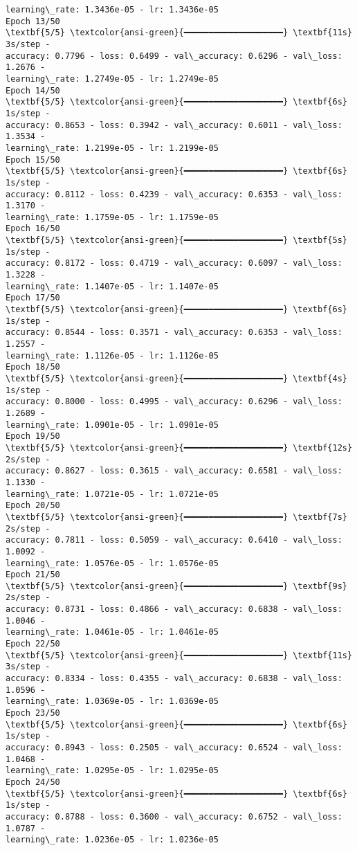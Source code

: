 \documentclass[11pt]{article}
\begin{document}
\begin{Verbatim}[commandchars=\\\{\}]
learning\_rate: 1.3436e-05 - lr: 1.3436e-05
Epoch 13/50
\textbf{5/5} \textcolor{ansi-green}{━━━━━━━━━━━━━━━━━━━━} \textbf{11s} 3s/step -
accuracy: 0.7796 - loss: 0.6499 - val\_accuracy: 0.6296 - val\_loss: 1.2676 -
learning\_rate: 1.2749e-05 - lr: 1.2749e-05
Epoch 14/50
\textbf{5/5} \textcolor{ansi-green}{━━━━━━━━━━━━━━━━━━━━} \textbf{6s} 1s/step -
accuracy: 0.8653 - loss: 0.3942 - val\_accuracy: 0.6011 - val\_loss: 1.3534 -
learning\_rate: 1.2199e-05 - lr: 1.2199e-05
Epoch 15/50
\textbf{5/5} \textcolor{ansi-green}{━━━━━━━━━━━━━━━━━━━━} \textbf{6s} 1s/step -
accuracy: 0.8112 - loss: 0.4239 - val\_accuracy: 0.6353 - val\_loss: 1.3170 -
learning\_rate: 1.1759e-05 - lr: 1.1759e-05
Epoch 16/50
\textbf{5/5} \textcolor{ansi-green}{━━━━━━━━━━━━━━━━━━━━} \textbf{5s} 1s/step -
accuracy: 0.8172 - loss: 0.4719 - val\_accuracy: 0.6097 - val\_loss: 1.3228 -
learning\_rate: 1.1407e-05 - lr: 1.1407e-05
Epoch 17/50
\textbf{5/5} \textcolor{ansi-green}{━━━━━━━━━━━━━━━━━━━━} \textbf{6s} 1s/step -
accuracy: 0.8544 - loss: 0.3571 - val\_accuracy: 0.6353 - val\_loss: 1.2557 -
learning\_rate: 1.1126e-05 - lr: 1.1126e-05
Epoch 18/50
\textbf{5/5} \textcolor{ansi-green}{━━━━━━━━━━━━━━━━━━━━} \textbf{4s} 1s/step -
accuracy: 0.8000 - loss: 0.4995 - val\_accuracy: 0.6296 - val\_loss: 1.2689 -
learning\_rate: 1.0901e-05 - lr: 1.0901e-05
Epoch 19/50
\textbf{5/5} \textcolor{ansi-green}{━━━━━━━━━━━━━━━━━━━━} \textbf{12s} 2s/step -
accuracy: 0.8627 - loss: 0.3615 - val\_accuracy: 0.6581 - val\_loss: 1.1330 -
learning\_rate: 1.0721e-05 - lr: 1.0721e-05
Epoch 20/50
\textbf{5/5} \textcolor{ansi-green}{━━━━━━━━━━━━━━━━━━━━} \textbf{7s} 2s/step -
accuracy: 0.7811 - loss: 0.5059 - val\_accuracy: 0.6410 - val\_loss: 1.0092 -
learning\_rate: 1.0576e-05 - lr: 1.0576e-05
Epoch 21/50
\textbf{5/5} \textcolor{ansi-green}{━━━━━━━━━━━━━━━━━━━━} \textbf{9s} 2s/step -
accuracy: 0.8731 - loss: 0.4866 - val\_accuracy: 0.6838 - val\_loss: 1.0046 -
learning\_rate: 1.0461e-05 - lr: 1.0461e-05
Epoch 22/50
\textbf{5/5} \textcolor{ansi-green}{━━━━━━━━━━━━━━━━━━━━} \textbf{11s} 3s/step -
accuracy: 0.8334 - loss: 0.4355 - val\_accuracy: 0.6838 - val\_loss: 1.0596 -
learning\_rate: 1.0369e-05 - lr: 1.0369e-05
Epoch 23/50
\textbf{5/5} \textcolor{ansi-green}{━━━━━━━━━━━━━━━━━━━━} \textbf{6s} 1s/step -
accuracy: 0.8943 - loss: 0.2505 - val\_accuracy: 0.6524 - val\_loss: 1.0468 -
learning\_rate: 1.0295e-05 - lr: 1.0295e-05
Epoch 24/50
\textbf{5/5} \textcolor{ansi-green}{━━━━━━━━━━━━━━━━━━━━} \textbf{6s} 1s/step -
accuracy: 0.8788 - loss: 0.3600 - val\_accuracy: 0.6752 - val\_loss: 1.0787 -
learning\_rate: 1.0236e-05 - lr: 1.0236e-05

\end{Verbatim}
\end{document}
